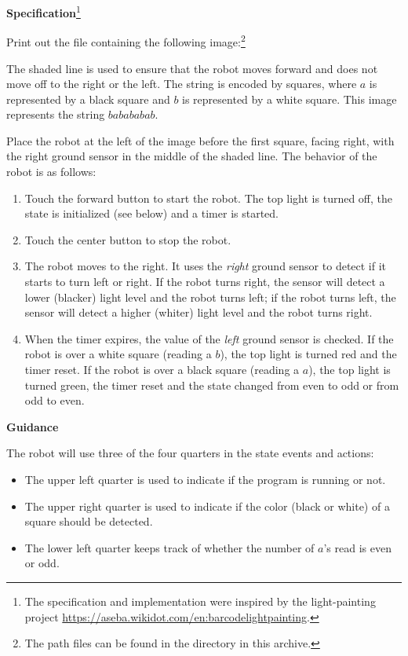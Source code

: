 \textbf{Specification}\footnote{The specification and implementation
were inspired by the light-painting project
\url{https://aseba.wikidot.com/en:barcodelightpainting}.}

Print out the file  containing the
following image:\footnote{The path files can be found in the directory
 in this archive.}


The shaded line is used to ensure that the robot moves forward and does
not move off to the right or the left. The string is encoded by squares,
where $a$ is represented by a black square and $b$ is represented by a
white square. This image represents the string $babababab$.

Place the robot at the left of the image before the first square, facing
right, with the right ground sensor in the middle of the shaded line.
The behavior of the robot is as follows:

\begin{enumerate}

\item Touch the forward button to start the robot. The top light is
turned off, the state is initialized (see below) and a timer is started.

\item Touch the center button to stop the robot.

\item The robot moves to the right. It uses the \emph{right} ground
sensor to detect if it starts to turn left or right. If the robot turns
right, the sensor will detect a lower (blacker) light level and the
robot turns left; if the robot turns left, the sensor will detect a
higher (whiter) light level and the robot turns right.

\item When the timer expires, the value of the \emph{left} ground sensor
is checked. If the robot is over a white square (reading a $b$), the top
light is turned red and the timer reset. If the robot is over a black
square (reading a $a$), the top light is turned green, the timer reset
and the state changed from even to odd or from odd to even.

\end{enumerate}


\textbf{Guidance}

The robot will use three of the four quarters in the state events and
actions:

\begin{itemize}
\item The upper left quarter is used to indicate if the program is
running or not.
\item The upper right quarter is used to indicate if the color (black or
white) of a square should be detected.
\item The lower left quarter keeps track of whether the
number of $a$'s read is even or odd.
\end{itemize}

